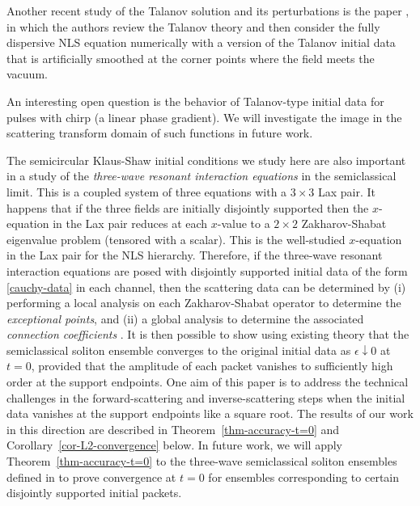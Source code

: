\documentclass[12pt]{amsart}
\numberwithin{equation}{section}
\begin{document}
\begin{note}
Another recent study of the Talanov solution and its perturbations is the paper \cite{DemontisORS23}, in which the authors 
review the Talanov theory and then consider the fully dispersive NLS equation numerically with a version of the Talanov 
initial data that is artificially smoothed at the corner points where the field meets the vacuum.  
\end{note}

\begin{note}
An interesting open question is the behavior of Talanov-type initial data for 
pulses with chirp (a linear phase gradient).  We will investigate the image 
in the scattering transform domain of such functions in future work.  
\end{note}

\begin{note}
The semicircular Klaus-Shaw initial conditions we study here are 
also important in a 
study of the \emph{three-wave resonant interaction equations} in the 
semiclassical limit.  This is a coupled system of three equations with a 
$3\times 3$ Lax pair.  It happens that if the three fields are initially 
disjointly supported then the $x$-equation in the Lax pair reduces at each $x$-value to a 
$2\times 2$ Zakharov-Shabat eigenvalue problem (tensored with a scalar).  
This is the well-studied $x$-equation in the Lax pair for the NLS hierarchy.  
Therefore, if the three-wave resonant interaction equations are posed with 
disjointly supported initial data of the form \eqref{cauchy-data} in each channel, then the 
scattering data can be determined by (i) performing a local analysis on each 
Zakharov-Shabat operator to determine the \emph{exceptional points}, and 
(ii) a global analysis to determine the associated \emph{connection 
coefficients} \cite{Buckingham:2016}.  It is then possible to show using existing theory \cite{Kamvissis:2003} that the semiclassical soliton 
ensemble converges to the original initial data as $\epsilon\downarrow 0$ 
at $t=0$, provided that the amplitude of each packet vanishes to sufficiently high order at the support endpoints.  One aim of this paper is to address the technical challenges in the forward-scattering 
and inverse-scattering steps when the initial data vanishes at the support endpoints like a 
square root.  
The results of our work in this direction are described in Theorem~\ref{thm-accuracy-t=0} and Corollary~\ref{cor-L2-convergence} below.
In future work, we will apply Theorem~\ref{thm-accuracy-t=0} to the 
three-wave semiclassical soliton ensembles defined in \cite{Buckingham:2016} 
to prove convergence at $t=0$ for ensembles corresponding to certain 
disjointly supported initial packets.  
\end{note}
\end{document}
